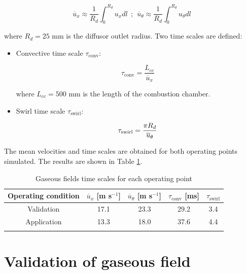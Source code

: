 \begin{equation}
\overline{u}_x \approx \frac{1}{R_d} \int_0^{R_d} u_x dl ~~ ; ~~ \overline{u}_\theta \approx \frac{1}{R_d} \int_0^{R_d} u_\theta dl
\end{equation}

where $R_d = 25$ mm is the diffusor outlet radius. Two time scales are defined: 

\begin{itemize}

	\item Convective time scale $\tau_\mathrm{conv}$:
	
	\begin{equation}
	\tau_\mathrm{conv} = \frac{L_{cc}}{\overline{u}_x} 
	\end{equation}
	
	where $L_{cc} = 500$ mm is the length of the combustion chamber.
	
	\item Swirl time scale $\tau_\mathrm{swirl}$:
	
	\begin{equation}
	\tau_\mathrm{swirl} = \frac{\pi R_d}{\overline{u}_{\scriptsize{\theta}}}
	\end{equation}	
	
\end{itemize}

The mean velocities and time scales are obtained for both operating points simulated. The results are shown in Table \ref{tab:gaseous_field_timescales}.

\begin{table}[!h]
\centering
\caption{Gaseous fields time scales for each operating point}
\begin{tabular}{ccccc}
\thickhline
Operating condition    & $\overline{u}_x$ [m s$^{-1}$]   & $\overline{u}_\theta$ [m s$^{-1}$] & $\tau_\mathrm{conv}$  [ms] &  $\tau_\mathrm{swirl}$ \\
\hline
Validation & 17.1 & 23.3  & 29.2 & 3.4 \\
Application & 13.3 & 18.0 & 37.6 & 4.4 \\
\thickhline
\end{tabular}
\label{tab:gaseous_field_timescales}
\end{table}


\section{Validation of gaseous field}
\label{sec:ch7_BIMER_validation_point}

